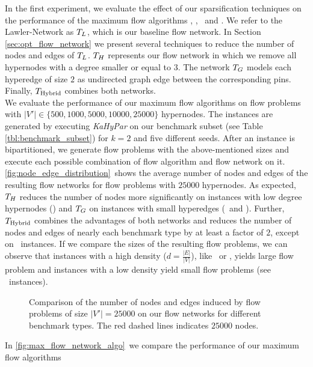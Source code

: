 In the first experiment, we evaluate the effect of our sparsification techniques
on the performance of the maximum flow algorithms \EdmondKarp, \GoldbergTarjan, \BoykovKolmogorov~and \IBFS. 
We refer to the Lawler-Network as $T_L$, which is our baseline flow network. In
Section \ref{sec:opt_flow_network} we present several techniques to reduce the number
of nodes and edges of $T_L$. $T_H$ represents our flow network in which
we remove all hypernodes with a degree smaller or equal to $3$. The network $T_G$ models
each hyperedge of size $2$ as undirected graph edge between the corresponding pins. Finally,
$T_{\text{Hybrid}}$ combines both networks. \\
We evaluate the performance of our maximum flow algorithms on flow problems with
$|V'| \in \{500,1000,5000,10000,25000\}$ hypernodes. The instances are generated by executing
\emph{KaHyPar} on our benchmark subset (see Table \ref{tbl:benchmark_subset}) for $k = 2$ and five different 
seeds. After an instance is bipartitioned, we generate flow problems
with the above-mentioned sizes and execute each possible combination of flow algorithm and
flow network on it. \\
\autoref{fig:node_edge_distribution}~shows the average number of nodes and edges
of the resulting flow networks for flow problems with $25000$ hypernodes. As expected,
$T_H$ reduces the number of nodes more significantly on instances with low
degree hypernodes (\Dual) and $T_G$ on instances with small hyperedges
(\Primal~and \Literal). Further, $T_{\text{Hybrid}}$ combines the advantages of both networks
and reduces the number of nodes and edges of nearly each benchmark type by at least a factor of $2$,
except on \SPM~instances. If we compare the sizes of the resulting flow problems, we can observe
that instances with a high density ($d = \frac{|E|}{|V|}$), like \Primal~or \Literal, yields large flow problem 
and instances with a low density yield small flow problems (see \Dual~instances). \\
\begin{figure}[ht!]
\centering
\caption{Comparison of the number of nodes and edges induced by flow problems 
         of size $|V'| = 25000$ on our flow networks for different benchmark types.
         The red dashed lines indicates $25000$ nodes.}
\label{fig:node_edge_distribution} 
\end{figure} 
In \autoref{fig:max_flow_network_algo}~we compare the performance of our maximum flow algorithms
